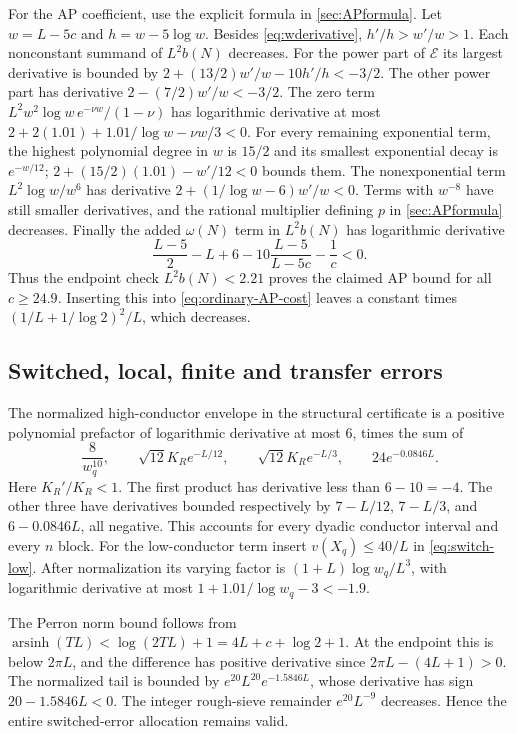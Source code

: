 \documentclass[11pt]{article}
\theoremstyle{definition}
\begin{document}
For the AP coefficient, use the explicit formula in
\cref{sec:APformula}.  Let $w=L-5c$ and $h=w-5\log w$.
Besides \eqref{eq:wderivative}, $h'/h>w'/w>1$.
Each nonconstant summand of $L^2b(N)$ decreases.
For the power part of $\mathcal E$ its largest derivative is bounded by
$2+(13/2)w'/w-10h'/h< -3/2$.
The other power part has derivative $2-(7/2)w'/w< -3/2$.
The zero term $L^2w^2\log w\,e^{-\nu w}/(1-\nu)$ has logarithmic
derivative at most
$2+2(1.01)+1.01/\log w-\nu w/3<0$.
For every remaining exponential term, the highest polynomial degree
in $w$ is $15/2$ and its smallest exponential decay is $e^{-w/12}$;
$2+(15/2)(1.01)-w'/12<0$ bounds them.
The nonexponential term $L^2\log w/w^6$ has derivative
$2+(1/\log w-6)w'/w<0$.
Terms with $w^{-8}$ have still smaller derivatives, and the rational
multiplier defining $p$ in \cref{sec:APformula} decreases.
Finally the added $\omega(N)$ term in $L^2b(N)$ has logarithmic
derivative
\[
 \frac{L-5}{2}-L+6-10\frac{L-5}{L-5c}-\frac1c<0.
\]
Thus the endpoint check $L^2b(N)<2.21$ proves the claimed AP bound
for all $c\ge24.9$.  Inserting this into \eqref{eq:ordinary-AP-cost}
leaves a constant times
$(1/L+1/\log2)^2/L$, which decreases.

\subsection{Switched, local, finite and transfer errors}

The normalized high-conductor envelope in the structural certificate
is a positive polynomial prefactor of logarithmic derivative at most
$6$, times the sum of
\[
 \frac8{w_q^{10}},\qquad
 \sqrt{12}K_R e^{-L/12},\qquad
 \sqrt{12}K_R e^{-L/3},\qquad
 24e^{-0.0846L}.
\]
Here $K_R'/K_R<1$.  The first product has derivative less than
$6-10=-4$.  The other three have derivatives bounded respectively by
$7-L/12$, $7-L/3$, and $6-0.0846L$, all negative.
This accounts for every dyadic conductor interval and every $n$ block.
For the low-conductor term insert $v(X_q)\le40/L$ in
\eqref{eq:switch-low}.  After normalization its varying factor is
$(1+L)\log w_q/L^3$, with logarithmic derivative at most
$1+1.01/\log w_q-3<-1.9$.

The Perron norm bound follows from
$\operatorname{arsinh}(TL)<\log(2TL)+1
 =4L+c+\log2+1$.
At the endpoint this is below $2\pi L$, and the difference has
positive derivative since $2\pi L-(4L+1)>0$.
The normalized tail is bounded by
$e^{20}L^{20}e^{-1.5846L}$, whose derivative has sign
$20-1.5846L<0$.
The integer rough-sieve remainder $e^{20}L^{-9}$ decreases.
Hence the entire switched-error allocation remains valid.
\end{document}
